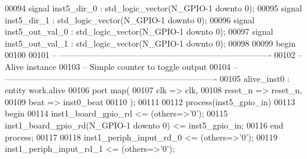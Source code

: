 \begin{DoxyCode}
00094 \textcolor{keywordflow}{signal} \textcolor{vhdlchar}{inst5_dir_0}                  \textcolor{vhdlchar}{:} \textcolor{comment}{std\_logic\_vector}\textcolor{vhdlchar}{(}\textcolor{vhdlchar}{N_GPIO}\textcolor{vhdlchar}{-}\textcolor{vhdllogic}{}\textcolor{vhdllogic}{1} \textcolor{keywordflow}{downto} \textcolor{vhdllogic}{}\textcolor{vhdllogic}{0}\textcolor{vhdlchar}{)};
00095 \textcolor{keywordflow}{signal} \textcolor{vhdlchar}{inst5_dir_1}                  \textcolor{vhdlchar}{:} \textcolor{comment}{std\_logic\_vector}\textcolor{vhdlchar}{(}\textcolor{vhdlchar}{N_GPIO}\textcolor{vhdlchar}{-}\textcolor{vhdllogic}{}\textcolor{vhdllogic}{1} \textcolor{keywordflow}{downto} \textcolor{vhdllogic}{}\textcolor{vhdllogic}{0}\textcolor{vhdlchar}{)};
00096 \textcolor{keywordflow}{signal} \textcolor{vhdlchar}{inst5_out_val_0}              \textcolor{vhdlchar}{:} \textcolor{comment}{std\_logic\_vector}\textcolor{vhdlchar}{(}\textcolor{vhdlchar}{N_GPIO}\textcolor{vhdlchar}{-}\textcolor{vhdllogic}{}\textcolor{vhdllogic}{1} \textcolor{keywordflow}{downto} \textcolor{vhdllogic}{}\textcolor{vhdllogic}{0}\textcolor{vhdlchar}{)};
00097 \textcolor{keywordflow}{signal} \textcolor{vhdlchar}{inst5_out_val_1}              \textcolor{vhdlchar}{:} \textcolor{comment}{std\_logic\_vector}\textcolor{vhdlchar}{(}\textcolor{vhdlchar}{N_GPIO}\textcolor{vhdlchar}{-}\textcolor{vhdllogic}{}\textcolor{vhdllogic}{1} \textcolor{keywordflow}{downto} \textcolor{vhdllogic}{}\textcolor{vhdllogic}{0}\textcolor{vhdlchar}{)};
00098 
00099 \textcolor{vhdlkeyword}{begin}
00100    
00101 \textcolor{keyword}{-- ----------------------------------------------------------------------------}
00102 \textcolor{keyword}{-- Alive instance}
00103 \textcolor{keyword}{-- Simple counter to toggle output}
00104 \textcolor{keyword}{-- ----------------------------------------------------------------------------   }
00105    alive\_inst0 : \textcolor{keywordflow}{entity} work.alive
00106    \textcolor{keywordflow}{port} \textcolor{keywordflow}{map}(
00107       clk      => clk,
00108       reset\_n  => reset_n,
00109       beat     => inst0_beat
00110    \textcolor{vhdlchar}{)};
00111 
00112    \textcolor{keywordflow}{process}(inst5_gpio_in)
00113 \textcolor{vhdlkeyword}{   begin }
00114       inst1\_board\_gpio\_rd <= (others=>'0');
00115       inst1\_board\_gpio\_rd(N\_GPIO-1 \textcolor{keywordflow}{downto} \textcolor{vhdllogic}{0}) <= inst5\_gpio\_in;
00116    \textcolor{keywordflow}{end} \textcolor{keywordflow}{process};
00117    
00118    inst1\_periph\_input\_rd\_0 <= (others=>'0');
00119    inst1\_periph\_input\_rd\_1 <= (others=>'0');

\end{DoxyCode}
